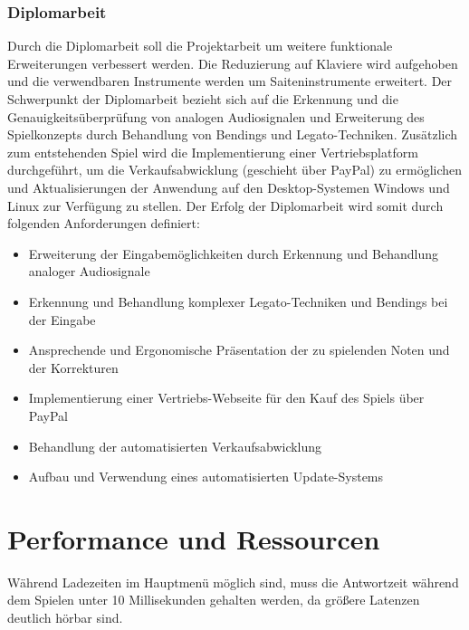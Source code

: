 \documentclass[12pt,a4paper]{report}
\begin{document}
      		\subsubsection{Diplomarbeit}
      		Durch die Diplomarbeit soll die Projektarbeit um weitere funktionale Erweiterungen verbessert werden.
      		Die Reduzierung auf Klaviere wird aufgehoben und die verwendbaren Instrumente werden um Saiteninstrumente erweitert.
      		Der Schwerpunkt der Diplomarbeit bezieht sich auf die Erkennung und die Genauigkeitsüberprüfung von analogen Audiosignalen und Erweiterung des Spielkonzepts durch Behandlung von Bendings und Legato-Techniken.
      		Zusätzlich zum entstehenden Spiel wird die Implementierung einer Vertriebsplatform durchgeführt, um die Verkaufsabwicklung (geschieht über PayPal) zu ermöglichen und Aktualisierungen der Anwendung auf den Desktop-Systemen Windows und Linux zur Verfügung zu stellen.
      		Der Erfolg der Diplomarbeit wird somit durch folgenden Anforderungen definiert:
      		\begin{itemize}
      			\item Erweiterung der Eingabemöglichkeiten durch Erkennung und Behandlung analoger Audiosignale
      			\item Erkennung und Behandlung komplexer Legato-Techniken und Bendings bei der Eingabe
      			\item Ansprechende und Ergonomische Präsentation der zu spielenden Noten und der Korrekturen
      			\item Implementierung einer Vertriebs-Webseite für den Kauf des Spiels über PayPal
      			\item Behandlung der automatisierten Verkaufsabwicklung
      			\item Aufbau und Verwendung eines automatisierten Update-Systems
      		\end{itemize}
    \section{Performance und Ressourcen}
      Während Ladezeiten im Hauptmenü möglich sind, muss die Antwortzeit während dem Spielen unter 10 Millisekunden gehalten werden, da größere Latenzen deutlich hörbar sind.
\end{document}
